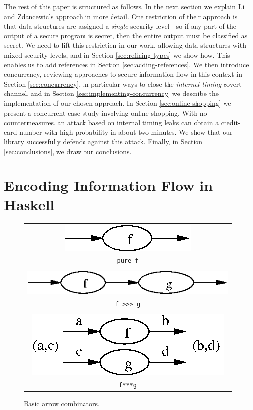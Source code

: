 \documentclass[times, 10pt,twocolumn]{article}
\begin{document}
The rest of this paper is structured as follows. In the next section
we explain Li and Zdancewic's approach in more detail. One restriction
of their approach is that data-structures are assigned a {\em single}
security level---so if any part of the output of a secure program is
secret, then the entire output must be classified as secret. We need
to lift this restriction in our work, allowing data-structures with
mixed security levels, and in Section \ref{sec:refining-types} we show
how. This enables us to add references in Section
\ref{sec:adding-references}. 
We
then introduce concurrency, reviewing approaches to secure information
flow in this context in Section \ref{sec:concurrency}, in particular
ways to close the {\em internal timing} covert channel, and in Section
\ref{sec:implementing-concurrency} we describe the implementation of
our chosen approach. In Section \ref{sec:online-shopping} we present a
concurrent case study involving online shopping. With no
countermeasures, an attack based on internal timing leaks can obtain a
credit-card number with high probability in about two minutes. We
show that our library successfully defends against this
attack. Finally, in Section \ref{sec:conclusions}, we draw our
conclusions.

\section{Encoding Information Flow in Haskell} \label{sec:encodingIF}

\begin{figure}
\begin{center}
\begin{tabular}{c}
\includegraphics{puref.eps}\\
{\tt pure f}\\
\\
\includegraphics{fcompg.eps}\\
{\tt f >>> g}\\
\\
\includegraphics{fpairg.eps}\\
{\tt f***g}
\end{tabular}
\caption{Basic arrow combinators.} \label{fig:arrows}
\end{center}
\end{figure}
\end{document}
